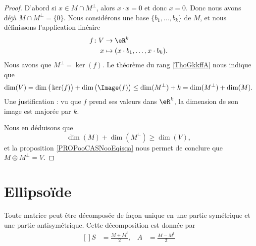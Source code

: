 \begin{proof}
    D'abord si \( x\in M\cap M^{\perp}\), alors \( x\cdot x=0\) et donc \( x=0\). Donc nous avons déjà \( M\cap M^{\perp}=\{ 0 \}\). Nous considérons une base \( \{b_1,\ldots, b_k\}\) de \( M\), et nous définissons l'application linéaire
    \begin{equation}
        \begin{aligned}
            f\colon V&\to \eR^k \\
            x&\mapsto (x\cdot b_1,\ldots, x\cdot b_k). 
        \end{aligned}
    \end{equation}
    Nous avons que \( M^{\perp}=\ker(f)\). Le théorème du rang \ref{ThoGkkffA} nous indique que
    \begin{equation}
        \dim(V)=\dim\big( \ker(f) \big)+\dim\big( \Image(f) \big)\leq \dim(M^{\perp})+k=\dim(M^{\perp})+\dim(M).
    \end{equation}
    Une justification : vu que \( f\) prend ses valeurs dans \( \eR^k\), la dimension de son image est majorée par \( k\).

    Nous en déduisons que 
    \begin{equation}
        \dim(M)+\dim(M^{\perp})\geq\dim(V),
    \end{equation}
    et la proposition \ref{PROPooCASNooEqisqa} nous permet de conclure que \( M\oplus M^{\perp}=V\).
\end{proof}

\section{Ellipsoïde}

\begin{lemma}   \label{LemYVWoohcjIX}
    Toute matrice peut être décomposée de façon unique en une partie symétrique et une partie antisymétrique. Cette décomposition est donnée par
\begin{equation}\label{subEqHIQooyhiWM}
    \begin{aligned}[]
            S&=\frac{ M+M^t }{ 2 },&A&=\frac{ M-M^t }{ 2 }
    \end{aligned}
\end{equation}
\end{lemma}

